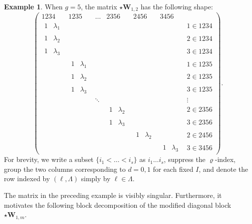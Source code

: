 \documentclass[12pt, letterpaper]{amsart}
\theoremstyle{definition}
\newtheorem{example}[theorem]{Example}
\newcommand{\bW}{\mathbf{W} }
\newcommand{\lbd}{\lambda}
\begin{document}
\begin{example}\label{ex:rk1}
When \(g=5\), the matrix \(\star\bW_{1,2}\) has the following shape:
\[
\left( \begin{array}{cccccc|c}
  1234 & 1235 & \dots & 2356 & 2456 & 3456 & \\
  \hline \begin{matrix} 1 & \lbd_1 \end{matrix} & & & & & & 1\in1234\\
  \begin{matrix} 1 & \lbd_2 \end{matrix} & & & & & & 2\in1234\\
  \begin{matrix} 1 & \lbd_3 \end{matrix} & & & & & & 3\in1234\\
  & \begin{matrix} 1 & \lbd_1 \end{matrix} & & & & & 1\in1235\\
  & \begin{matrix} 1 & \lbd_2 \end{matrix} & & & & & 2\in1235\\
  & \begin{matrix} 1 & \lbd_3 \end{matrix} & & & & & 3\in1235\\
  & & \ddots & & & & \vdots\\
  & & & \begin{matrix} 1 & \lbd_2 \end{matrix} & & & 2\in2356\\
  & & & \begin{matrix} 1 & \lbd_3 \end{matrix} & & & 3\in2356\\
  & & & & \begin{matrix} 1 & \lbd_2 \end{matrix} & & 2\in2456\\
  & & & & & \begin{matrix} 1 & \lbd_3 \end{matrix} & 3\in3456
\end{array} \right).
\]
For brevity, we write a subset \(\{i_1<\dots<i_s\}\) as \(i_1\dots i_s\), suppress the \(\varrho\)-index, group the two columns corresponding to \(d=0,1\) for each fixed \(I\), and denote the row indexed by \((\ell,\Lambda)\) simply by \(\ell\in\Lambda\).
\end{example}

The matrix in the preceding example is visibly singular. Furthermore, it motivates the following block decomposition of the modified diagonal block \(\star\bW_{1,m}\).
\end{document}
